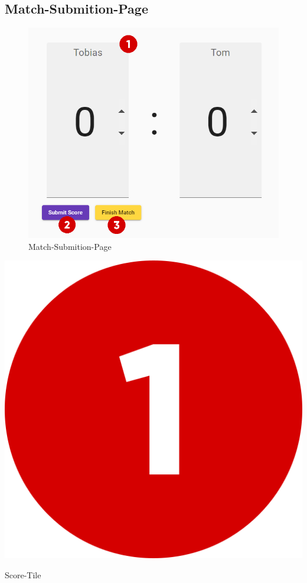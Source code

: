 \bigskip
\subsection{Match-Submition-Page}
\begin{figure}[H]
    \includegraphics[scale=0.6]{pics/user-guide/match-submition-page.PNG}
    \caption{Match-Submition-Page}
\end{figure}

\bigskip
\includegraphics[scale=0.05]{pics/user-guide/numbers/number-1.png} \begin{LARGE} Score-Tile \end{LARGE}


